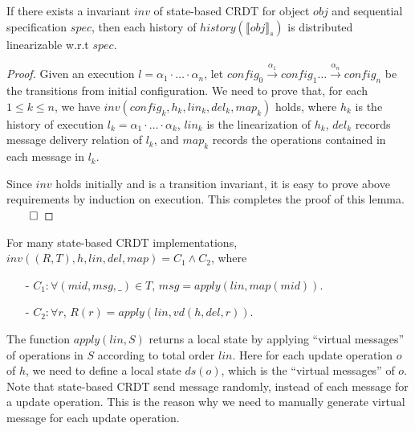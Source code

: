 {\begin{lemma}
\label{lemma:invariant of state-based CRDT implies distributed linearizability}
If there exists a invariant $\mathit{inv}$ of state-based CRDT for object $\mathit{obj}$ and sequential specification $\mathit{spec}$, then each history of $\mathit{history}(\llbracket \mathit{obj} \rrbracket_s)$ is distributed linearizable w.r.t $\mathit{spec}$.
\end{lemma}

\begin {proof}
Given an execution $l=\alpha_1 \cdot \ldots \cdot \alpha_n$, let $\mathit{config}_0 {\xrightarrow{\alpha_1}} \mathit{config}_1 \ldots {\xrightarrow{\alpha_n}} \mathit{config}_n$ be the transitions from initial configuration. We need to prove that, for each $1 \leq k \leq n$, we have $\mathit{inv}(\mathit{config}_k,h_k,\mathit{lin}_k,\mathit{del}_k,\mathit{map}_k)$ holds, where $h_k$ is the history of execution $l_k = \alpha_1 \cdot \ldots \cdot \alpha_k$, $\mathit{lin}_k$ is the linearization of $h_k$, $\mathit{del}_k$ records message delivery relation of $l_k$, and $\mathit{map}_k$ records the operations contained in each message in $l_k$.

Since $\mathit{inv}$ holds initially and is a transition invariant, it is easy to prove above requirements by induction on execution. This completes the proof of this lemma. $\qed$
\end {proof}


For many state-based CRDT implementations, $\mathit{inv}((R,T),h,\mathit{lin},\mathit{del},\mathit{map}) = C_1 \wedge C_2$, where

\begin{itemize}
\setlength{\itemsep}{0.5pt}

\item[-] $C_1: \forall (\mathit{mid},\mathit{msg},\_) \in T$, $\mathit{msg} = \mathit{apply}(\mathit{lin},\mathit{map}(\mathit{mid}))$.

\item[-] $C_2: \forall r$, $R(r) = \mathit{apply}(\mathit{lin},\mathit{vd}(h,\mathit{del},r))$.
\end{itemize}

The function $\mathit{apply}(\mathit{lin},S)$ returns a local state by applying ``virtual messages'' of operations in $S$ according to total order $\mathit{lin}$. Here for each update operation $o$ of $h$, we need to define a local state $\mathit{ds}(o)$, which is the ``virtual messages'' of $o$. Note that state-based CRDT send message randomly, instead of each message for a update operation. This is the reason why we need to manually generate virtual message for each update operation.

}
